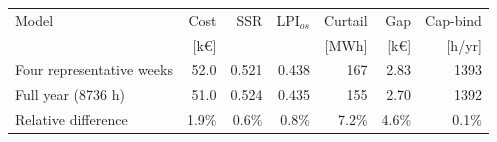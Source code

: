 \begin{tabular*}{\textwidth}{@{\extracolsep{\fill}}lrrrrrr@{}}
\toprule
Model & Cost & SSR & LPI$_{os}$ & Curtail & Gap & Cap-bind \\
 & [k\euro] & & & [MWh] & [k\euro] & [h/yr] \\
\midrule
Four representative weeks & 52.0 & 0.521 & 0.438 & 167 & 2.83 & 1393 \\
Full year (8736 h) & 51.0 & 0.524 & 0.435 & 155 & 2.70 & 1392 \\
\midrule
Relative difference & 1.9\% & 0.6\% & 0.8\% & 7.2\% & 4.6\% & 0.1\% \\
\bottomrule
\end{tabular*}

